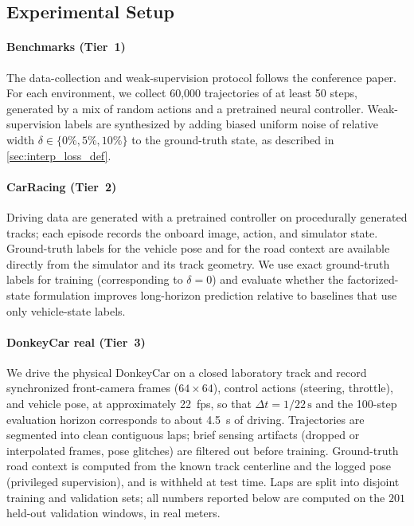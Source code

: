 \documentclass[preprint,12pt]{elsarticle}
\begin{document}
\subsection{Experimental Setup}\label{sec:setup}

\paragraph{Benchmarks (Tier~1)}
The data-collection and weak-supervision protocol follows the conference paper.
For each environment, we collect 60{,}000 trajectories of at least 50 steps,
generated by a mix of random actions and a pretrained neural controller.
Weak-supervision labels are synthesized by adding biased uniform noise of relative
width $\delta \in \{0\%, 5\%, 10\%\}$ to the ground-truth state, as described in
\ref{sec:interp_loss_def}.

\paragraph{CarRacing (Tier~2)}
Driving data are generated with a pretrained controller on procedurally generated
tracks; each episode records the onboard image, action, and simulator state.
Ground-truth labels for the vehicle pose and for the road context are available
directly from the simulator and its track geometry.
We use exact ground-truth labels for training (corresponding to $\delta = 0$) and
evaluate whether the factorized-state formulation improves long-horizon prediction
relative to baselines that use only vehicle-state labels.

\paragraph{DonkeyCar real (Tier~3)}
We drive the physical DonkeyCar on a closed laboratory track and record
synchronized front-camera frames ($64 \times 64$), control actions
(steering, throttle), and vehicle pose, at approximately \SI{22}{fps}, so that
$\Delta t = 1/22\,\mathrm{s}$ and the 100-step evaluation horizon corresponds to
about \SI{4.5}{s} of driving.
Trajectories are segmented into clean contiguous laps; brief sensing artifacts
(dropped or interpolated frames, pose glitches) are filtered out before training.
Ground-truth road context is computed from the known track centerline and the
logged pose (privileged supervision), and is withheld at test time.
Laps are split into disjoint training and validation sets; all numbers reported
below are computed on the $201$ held-out validation windows, in real meters.
\end{document}
